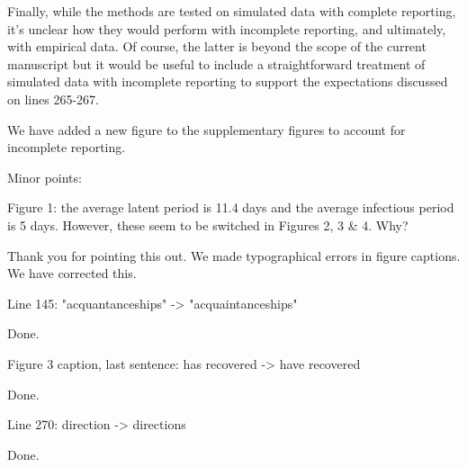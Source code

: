 \documentclass[12pt]{article}
\newcommand{\revtext}{\textsf}
\begin{document}
\revtext{Finally, while the methods are tested on simulated data with complete reporting, it's unclear how they would perform with incomplete reporting, and ultimately, with empirical data. Of course, the latter is beyond the scope of the current manuscript but it would be useful to include a straightforward treatment of simulated data with incomplete reporting to support the expectations discussed on lines 265-267.}

We have added a new figure to the supplementary figures to account for incomplete reporting.

\revtext{Minor points:}

\revtext{Figure 1: the average latent period is 11.4 days and the average infectious period is 5 days. However, these seem to be switched in Figures 2, 3 \& 4. Why?}

Thank you for pointing this out. We made typographical errors in figure captions. We have corrected this.

\revtext{Line 145: "acquantanceships" -> "acquaintanceships"}

Done.

\revtext{Figure 3 caption, last sentence: has recovered -> have recovered}

Done.

\revtext{Line 270: direction -> directions }

Done.


\end{document}
